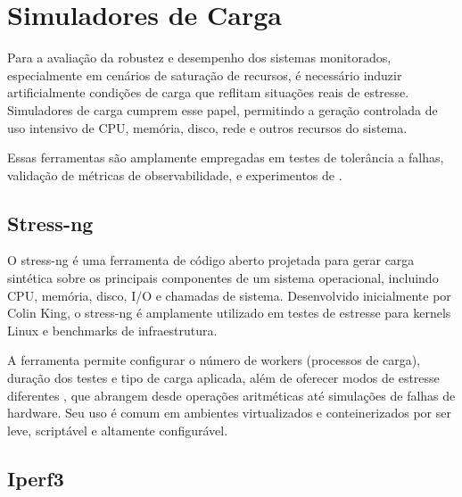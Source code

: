 \section{Simuladores de Carga}
\label{section:SimuladoresCarga}

{\color{red}

Para a avaliação da robustez e desempenho dos sistemas monitorados, especialmente em cenários de saturação de recursos, é necessário induzir artificialmente condições de carga que reflitam situações reais de estresse. Simuladores de carga cumprem esse papel, permitindo a geração controlada de uso intensivo de CPU, memória, disco, rede e outros recursos do sistema.

Essas ferramentas são amplamente empregadas em testes de tolerância a falhas, validação de métricas de observabilidade, e experimentos de .

}

\subsection{Stress-ng}
\label{subsection:StressNG}

{\color{red}

O stress-ng \citep{stressng2025} é uma ferramenta de código aberto projetada para gerar carga sintética sobre os principais componentes de um sistema operacional, incluindo CPU, memória, disco, I/O e chamadas de sistema. Desenvolvido inicialmente por Colin King, o stress-ng é amplamente utilizado em testes de estresse para kernels Linux e benchmarks de infraestrutura.

A ferramenta permite configurar o número de workers (processos de carga), duração dos testes e tipo de carga aplicada, além de oferecer modos de estresse diferentes , que abrangem desde operações aritméticas até simulações de falhas de hardware. Seu uso é comum em ambientes virtualizados e conteinerizados por ser leve, scriptável e altamente configurável.


}

\subsection{Iperf3}
\label{subsection:Iperf3}

